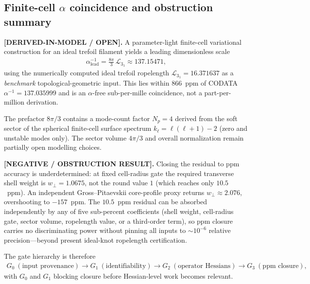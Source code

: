 
        \subsection{Finite-cell $\alpha$ coincidence and obstruction summary}
            \label{subsec:finite_cell_alpha_obstruction}

            \textbf{[DERIVED-IN-MODEL / OPEN].}
            A parameter-light finite-cell variational construction for an ideal trefoil filament
            yields a leading dimensionless scale
            \begin{align}
                \alpha^{-1}_{\mathrm{lead}}
                =
                \frac{8\pi}{3}\,\mathcal{L}_{3_1}
                \approx 137.15471,
                \label{eq:alpha_lead_finite_cell}
            \end{align}
            using the numerically computed ideal trefoil ropelength
            $\mathcal{L}_{3_1}=16.371637$ as a \emph{benchmark} topological-geometric input.
            This lies within $866$~ppm of CODATA $\alpha^{-1}=137.035999$ and is an
            $\alpha$-free sub-per-mille coincidence, not a part-per-million derivation.

            The prefactor $8\pi/3$ contains a mode-count factor $N_p=4$ derived from the
            soft sector of the spherical finite-cell surface spectrum
            $k_\ell=\ell(\ell+1)-2$ (zero and unstable modes only). The sector volume
            $4\pi/3$ and overall normalization remain partially open modelling choices.

            \textbf{[NEGATIVE / OBSTRUCTION RESULT].}
            Closing the residual to ppm accuracy is underdetermined: at fixed cell-radius
            gate the required transverse shell weight is $w_\perp=1.0675$, not the round
            value $1$ (which reaches only $10.5$~ppm). An independent Gross--Pitaevskii
            core-profile proxy returns $w_\perp\approx 2.076$, overshooting to $-157$~ppm.
            The $10.5$~ppm residual can be absorbed independently by any of five
            sub-percent coefficients (shell weight, cell-radius gate, sector volume,
            ropelength value, or a third-order term), so ppm closure carries no
            discriminating power without pinning all inputs to $\sim10^{-6}$ relative
            precision---beyond present ideal-knot ropelength certification.

            The gate hierarchy is therefore
            \begin{align}
                G_0\ (\text{input provenance})
                \longrightarrow
                G_1\ (\text{identifiability})
                \longrightarrow
                G_2\ (\text{operator Hessians})
                \longrightarrow
                G_3\ (\text{ppm closure}),
                \label{eq:finite_cell_gate_hierarchy}
            \end{align}
            with $G_0$ and $G_1$ blocking closure before Hessian-level work becomes relevant.

